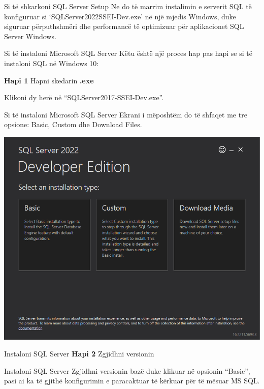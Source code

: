 \documentclass[
  ignorenonframetext,
]{beamer}
\begin{document}
\begin{frame}{Si të shkarkoni SQL Server Setup}
\label{si-tuxeb-shkarkoni-sql-server-setup-5}
Ne do të marrim instalimin e serverit SQL të konfiguruar si
`SQLServer2022SSEI-Dev.exe' në një mjedis Windows, duke siguruar
përputhshmëri dhe performancë të optimizuar për aplikacionet SQL Server
Windows.
\end{frame}

\begin{frame}{Si të instaloni Microsoft SQL Server}
\label{si-tuxeb-instaloni-microsoft-sql-server}
Këtu është një proces hap pas hapi se si të instaloni SQL në Windows 10:

\textbf{Hapi 1} Hapni skedarin \textbf{.exe}

Klikoni dy herë në ``SQLServer2017-SSEI-Dev.exe''.
\end{frame}

\begin{frame}{Si të instaloni Microsoft SQL Server}
\label{si-tuxeb-instaloni-microsoft-sql-server-1}
Ekrani i mëposhtëm do të shfaqet me tre opsione: Basic, Custom dhe
Download Files.

\includegraphics{./Figs/install2.png}
\end{frame}

\begin{frame}{Instaloni SQL Server}
\label{instaloni-sql-server}
\textbf{Hapi 2} Zgjidhni versionin
\end{frame}

\begin{frame}{Instaloni SQL Server}
\label{instaloni-sql-server-1}
Zgjidhni versionin bazë duke klikuar në opsionin ``Basic'', pasi ai ka
të gjithë konfigurimin e paracaktuar të kërkuar për të mësuar MS SQL.
\end{frame}
\end{document}
